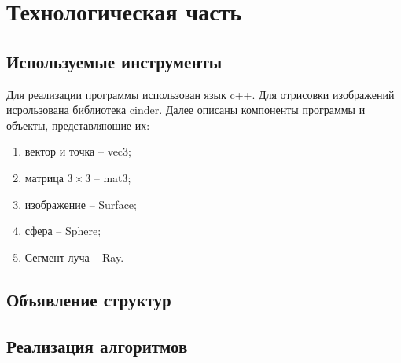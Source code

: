 \chapter{Технологическая часть}
\section {Используемые инструменты} {
    Для реализации программы использован язык c++.
    Для отрисовки изображений исрользована библиотека cinder.
    Далее описаны компоненты программы и объекты, представляющие их:
    \begin{enumerate}
        \item вектор и точка -- vec3;
        \item матрица $3 \times 3$ -- mat3;
        \item изображение -- Surface;
        \item сфера -- Sphere;
        \item Сегмент луча -- Ray.
    \end{enumerate}

    \section{Объявление структур} {
    
    }

    \section{Реализация алгоритмов} {
        
    }
}